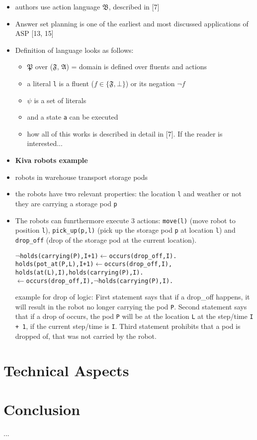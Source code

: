 \documentclass[runningheads]{llncs}
\begin{document}
\begin{itemize}
    \item authors use action language $\mathfrak{B}$, described in [7]
    \item Answer set planning is one of the earliest and most discussed applications of ASP [13, 15]
    \item Definition of language looks as follows: 
    \begin{itemize}
        \item $\mathfrak{P}$ over ($\mathfrak{F}$, $\mathfrak{A}$) = domain is defined over fluents and actions
        \item a literal \verb|l| is a fluent ($f \in \{\mathfrak{F},\bot\}$) or its negation $\neg f$
        \item $\psi$ is a set of literals
        \item and a state \verb|a| can be executed
        \item how all of this works is described in detail in [7]. If the reader is interested...
    \end{itemize}
    \item \textbf{Kiva robots example}
    \item robots in warehouse transport storage pods
    \item the robots have two relevant properties: the location \verb|l| and weather or not they are carrying a storage pod \verb|p|
    \item The robots can funrthermore execute 3 actions: \verb|move(l)| (move robot to position \verb|l|), \verb|pick_up(p,l)| (pick up the storage pod \verb|p| at location \verb|l|) and \verb|drop_off| (drop of the storage pod at the current location).
    \begin{alltt}
        \(\neg\)holds(carrying(P), I + 1) \(\leftarrow\) occurs(drop_off, I).
        holds(pot_at(P, L), I + 1) \(\leftarrow\) occurs(drop_off, I), 
            holds(at(L), I), holds(carrying(P), I). 
        \(\leftarrow\) occurs(drop_off, I), \(\neg\)holds(carrying(P), I). 
    \end{alltt}
    example for drop of logic: First statement says that if a drop\_off happens, it will result in the robot no longer carrying the pod \verb|P|. 
    Second statement says that if a drop of occurs, the pod \verb|P| will be at the location \verb|L| at the step/time \verb|I + 1|, if the current step/time is \verb|I|. 
    Third statement prohibits that a pod is dropped of, that was not carried by the robot. 
\end{itemize}

\section{Technical Aspects} \label{sec:ta}



\section{Conclusion} \label{sec:conclusion}

...




\end{document}
